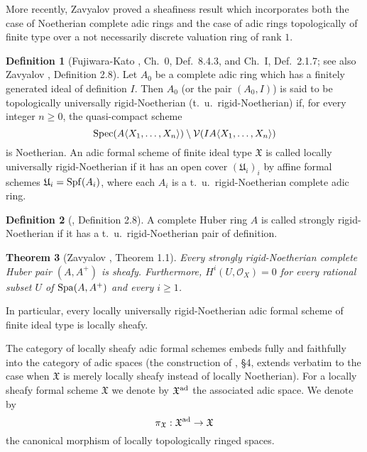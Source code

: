 \documentclass[12pt,twoside,a4paper]{article}
\newtheorem{thm}{Theorem}[section]
\theoremstyle{definition}
\newtheorem{mydef}[thm]{Definition}
\theoremstyle{remark}
\newcommand\ad{{\rm ad}}
\newcommand\Spa{{\rm Spa}}
\newcommand\Spec{{\rm Spec}}
\newcommand\Spf{{\rm Spf}}
\begin{document}
More recently, Zavyalov proved a sheafiness result which incorporates both the case of Noetherian complete adic rings and the case of adic rings topologically of finite type over a not necessarily discrete valuation ring of rank $1$.
\begin{mydef}[Fujiwara-Kato \cite{FK}, Ch.~0, Def.~8.4.3, and Ch.~I, Def.~2.1.7; see also Zavyalov \cite{Zavyalov22}, Definition 2.8]Let $A_{0}$ be a complete adic ring which has a finitely generated ideal of definition $I$. Then $A_{0}$ (or the pair $(A_{0}, I)$) is said to be topologically universally rigid-Noetherian (t.~u.~rigid-Noetherian) if, for every integer $n\geq 0$, the quasi-compact scheme \begin{equation*}\Spec(A\langle X_1,\dots, X_n\rangle)\setminus\mathcal{V}(IA\langle X_1,\dots,X_n\rangle)\end{equation*}is Noetherian. An adic formal scheme of finite ideal type $\mathfrak{X}$ is called locally universally rigid-Noetherian if it has an open cover $(\mathfrak{U}_{i})_{i}$ by affine formal schemes $\mathfrak{U}_{i}=\Spf(A_{i})$, where each $A_{i}$ is a t.~u.~rigid-Noetherian complete adic ring.\end{mydef}
\begin{mydef}[\cite{Zavyalov22}, Definition 2.8]\label{Strongly rigid-Noetherian}A complete Huber ring $A$ is called strongly rigid-Noetherian if it has a t.~u.~rigid-Noetherian pair of definition.\end{mydef} 
\begin{thm}[Zavyalov \cite{Zavyalov22}, Theorem 1.1]\label{Zavyalov's theorem}Every strongly rigid-Noetherian complete Huber pair $(A, A^{+})$ is sheafy. Furthermore, $H^{i}(U, \mathcal{O}_{X})=0$ for every rational subset $U$ of $\Spa(A, A^{+})$ and every $i\geq1$.\end{thm}    
In particular, every locally universally rigid-Noetherian adic formal scheme of finite ideal type is locally sheafy. 

The category of locally sheafy adic formal schemes embeds fully and faithfully into the category of adic spaces (the construction of \cite{Huber2}, \S4, extends verbatim to the case when $\mathfrak{X}$ is merely locally sheafy instead of locally Noetherian). For a locally sheafy formal scheme $\mathfrak{X}$ we denote by $\mathfrak{X}^{\ad}$ the associated adic space. We denote by \begin{equation*}\pi_{\mathfrak{X}}: \mathfrak{X}^{\ad}\to\mathfrak{X}\end{equation*}the canonical morphism of locally topologically ringed spaces. 
 
\end{document}
